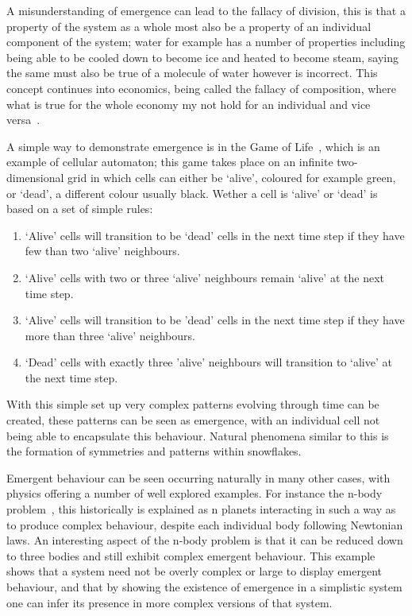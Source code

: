 \documentclass{article}
\begin{document}
A misunderstanding of emergence can lead to the fallacy of division, this is that a property of the system as a whole most also be a property of an individual component of the system; water for example has a number of properties including being able to be cooled down to become ice and heated to become steam, saying the same must also be true of a molecule of water however is incorrect. This concept continues into economics, being called the fallacy of composition, where what is true for the whole economy my not hold for an individual and vice versa~\cite{fallacyofcompostionBook}.
       
A simple way to demonstrate emergence is in the Game of Life~\cite{gameoflifepage}, which is an example of cellular automaton; this game takes place on an infinite two-dimensional grid in which cells can either be `alive', coloured for example green, or `dead', a different colour usually black. Wether a cell is `alive' or `dead' is based on a set of simple rules:   
\begin{enumerate}
  \item `Alive' cells will transition to be `dead' cells in the next time step if they have few than two `alive' neighbours.
  \item `Alive' cells with two or three `alive' neighbours remain `alive' at the next time step.
  \item `Alive' cells will transition to be 'dead' cells in the next time step if they have more than three `alive' neighbours.
  \item `Dead' cells with exactly three 'alive' neighbours will transition to `alive' at the next time step.
\end{enumerate}
With this simple set up very complex patterns evolving through time can be created, these patterns can be seen as emergence, with an individual cell not being able to encapsulate this behaviour. Natural phenomena similar to this is the formation of symmetries and patterns within snowflakes.

Emergent behaviour can be seen occurring naturally in many other cases, with physics offering a number of well explored examples. For instance the n-body problem~\cite{nbodyproblem}, this historically is explained as n planets interacting in such a way as to produce complex behaviour, despite each individual body following Newtonian laws. An interesting aspect of the n-body problem is that it can be reduced down to three bodies and still exhibit complex emergent behaviour. This example shows that a system need not be overly complex or large to display emergent behaviour, and that by showing the existence of emergence in a simplistic system one can infer its presence in more complex versions of that system.
\end{document}
